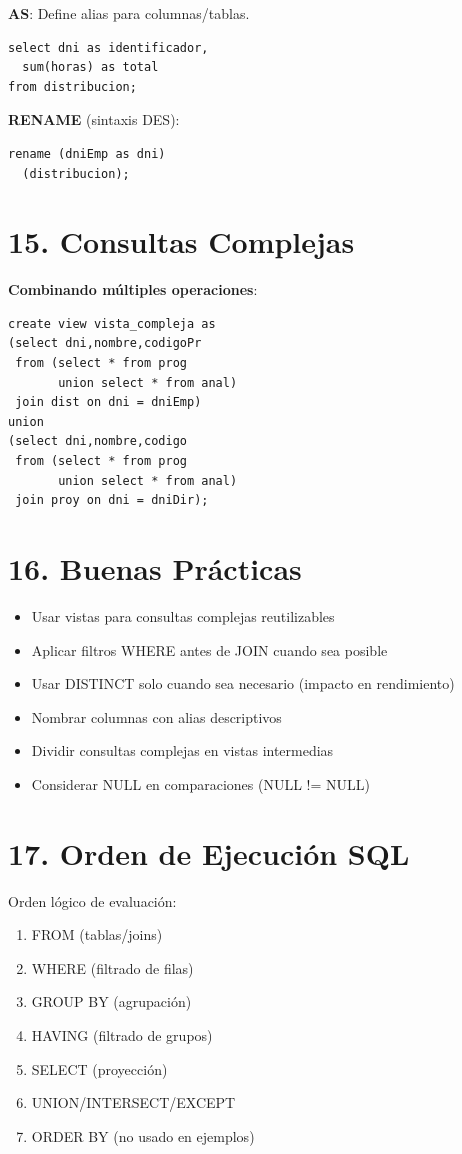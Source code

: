 \documentclass[10pt,a4paper,twocolumn]{article}
\begin{document}
\textbf{AS}: Define alias para columnas/tablas.
\begin{lstlisting}
select dni as identificador,
  sum(horas) as total
from distribucion;
\end{lstlisting}

\textbf{RENAME} (sintaxis DES):
\begin{lstlisting}
rename (dniEmp as dni)
  (distribucion);
\end{lstlisting}

\section*{15. Consultas Complejas}

\textbf{Combinando múltiples operaciones}:
\begin{lstlisting}
create view vista_compleja as
(select dni,nombre,codigoPr 
 from (select * from prog 
       union select * from anal)
 join dist on dni = dniEmp)
union
(select dni,nombre,codigo 
 from (select * from prog 
       union select * from anal)
 join proy on dni = dniDir);
\end{lstlisting}

\section*{16. Buenas Prácticas}

\begin{itemize}
\item Usar vistas para consultas complejas reutilizables
\item Aplicar filtros WHERE antes de JOIN cuando sea posible
\item Usar DISTINCT solo cuando sea necesario (impacto en rendimiento)
\item Nombrar columnas con alias descriptivos
\item Dividir consultas complejas en vistas intermedias
\item Considerar NULL en comparaciones (NULL != NULL)
\end{itemize}

\section*{17. Orden de Ejecución SQL}

Orden lógico de evaluación:
\begin{enumerate}[noitemsep]
\item FROM (tablas/joins)
\item WHERE (filtrado de filas)
\item GROUP BY (agrupación)
\item HAVING (filtrado de grupos)
\item SELECT (proyección)
\item UNION/INTERSECT/EXCEPT
\item ORDER BY (no usado en ejemplos)
\end{enumerate}
\end{document}
